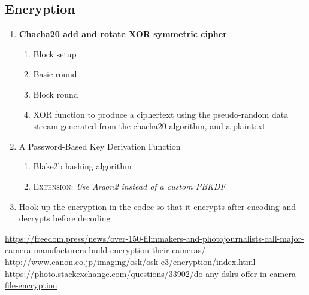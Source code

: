 \documentclass{article}
\begin{document}
\subsection{Encryption}
\begin{enumerate}
    \item \textbf{Chacha20 add and rotate XOR symmetric cipher}
    \begin{enumerate}
        \item Block setup
        \item Basic round
        \item Block round
        \item XOR function to produce a ciphertext using the pseudo-random data stream generated from the chacha20 algorithm, and a plaintext
    \end{enumerate}
    \item A Password-Based Key Derivation Function
    \begin{enumerate}        
        \item Blake2b hashing algorithm
        \item \textsc{Extension:} \textit{Use Argon2 instead of a custom PBKDF}
    \end{enumerate}
    \item Hook up the encryption in the codec so that it encrypts after encoding and decrypts before decoding
\end{enumerate}

\begin{thebibliography}{9}
 \url{https://freedom.press/news/over-150-filmmakers-and-photojournalists-call-major-camera-manufacturers-build-encryption-their-cameras/}
 \url{http://www.canon.co.jp/imaging/osk/osk-e3/encryption/index.html}
 \url{https://photo.stackexchange.com/questions/33902/do-any-dslrs-offer-in-camera-file-encryption}
\end{thebibliography}
\end{document}
